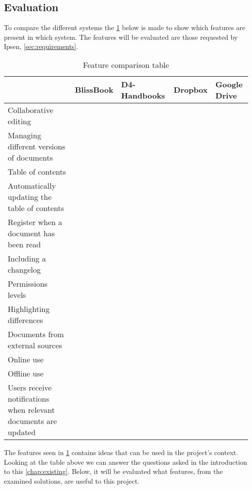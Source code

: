 \subsection{Evaluation}\label{sec:solutionsevaluation}
To compare the different systems the \cref{tab:Exsisting} below is made to show which features are present in which system.
The features will be evaluated are those requested by Ipsen, \cref{sec:requirements}.

\begin{table}[H]
	\begin{center}
		\begin{tabular}{| m{5cm}|m{1.6cm}|m{2cm}|m{1.5cm}|m{1.2cm}|}
			\hline
			& BlissBook  & D4-Handbooks & Dropbox & Google \newline Drive \\
			\hline
			Collaborative editing & \checkmark & & & \checkmark \\
			\hline
			Managing different versions of documents & \checkmark &  &  & \checkmark \\
			\hline
			Table of contents & \checkmark & \checkmark  & & \\
			\hline
			Automatically updating the table of contents & \checkmark & \checkmark  &  & \\
			\hline
			Register when a document has been read & \checkmark & \checkmark &  & \\
			\hline
			Including a changelog & \checkmark & \checkmark  &  & \\
			\hline
			Permissions levels & \checkmark &  & \checkmark & \checkmark \\
			\hline
			Highlighting differences & \checkmark &  &  & \checkmark\\
			\hline
			Documents from external \newline sources &  &  & \checkmark & \checkmark \\
			\hline
			Online use & \checkmark &  \checkmark & \checkmark  & \checkmark \\
			\hline
			Offline use & & \checkmark & \checkmark & \checkmark \\
			\hline
			Users receive notifications when relevant documents are updated & & \checkmark & & \\
			\hline
		\end{tabular}
		\caption{Feature comparison table}\label{tab:Exsisting}
	\end{center}
\end{table}

The features seen in \cref{tab:Exsisting} contains ideas that can be used in the project's context.
Looking at the table above we can answer the questions asked in the introduction to this \cref{chap:existing}.
Below, it will be evaluated what features, from the examined solutions, are useful to this project.

